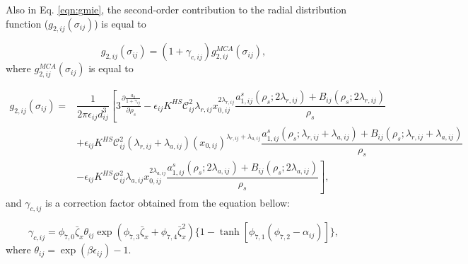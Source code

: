 Also in Eq. \ref{eqn:gmie}, the second-order contribution to the radial distribution function ($g_{2,ij}(\sigma_{ij})$) is equal to

\begin{equation}
g_{2,ij}(\sigma_{ij}) = (1 + \gamma_{c,ij}) g_{2,ij}^{MCA}(\sigma_{ij}), 
\end{equation}
where $g_{2,ij}^{MCA}(\sigma_{ij})$ is equal to

\begin{equation}
\begin{aligned}
g_{2,ij}(\sigma_{ij}) {}=& \dfrac{1}{2 \pi \epsilon_{ij} d _{ij}^{3}} \left[3 \frac{\partial \frac{a_{2}}{1+\gamma_{ij}}}{\partial \rho _{s}} - \epsilon_{ij} K^{HS} \mathcal{C}_{ij}^{2} \lambda_{r,ij} x_{0,ij}^{2\lambda_{r,ij}} \dfrac{a_{1,ij}^{s}(\rho_{s};2\lambda_{r,ij})+B_{ij}(\rho_{s};2\lambda_{r,ij})}{\rho _{s}} \right. \\
& \left. + \epsilon_{ij} K^{HS} \mathcal{C}_{ij}^{2} (\lambda_{r,ij}+\lambda_{a,ij}) (x_{0,ij})^{\lambda_{r,ij}+\lambda_{a,ij}} \dfrac{a_{1,ij}^{s}(\rho_{s};\lambda_{r,ij}+\lambda_{a,ij})+B_{ij}(\rho_{s};\lambda_{r,ij}+\lambda_{a,ij})}{\rho _{s}} \right. \\
& \left. - \epsilon_{ij} K^{HS} \mathcal{C}_{ij}^{2} \lambda_{a,ij} x_{0,ij}^{2\lambda_{a,ij}} \dfrac{a_{1,ij}^{s}(\rho_{s};2\lambda_{a,ij})+B_{ij}(\rho_{s};2\lambda_{a,ij})}{\rho _{s}}\right],
\end{aligned}
\end{equation} 
and $\gamma_{c,ij}$ is a correction factor obtained from the equation bellow:

\begin{equation}
\gamma_{c,ij} = \phi_{7,0} \bar{\zeta}_{x} \theta_{ij} \exp(\phi_{7,3} \bar{\zeta}_{x} + \phi_{7,4} \bar{\zeta}_{x}^2) \lbrace 1-\tanh [\phi_{7,1}(\phi_{7,2} - \alpha _{ij})] \rbrace,
\end{equation}
where $\theta _{ij} = \exp (\beta \epsilon_{ij}) -1$.
